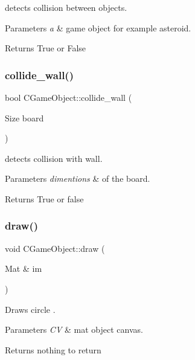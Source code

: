 detects collision between objects. 


\begin{DoxyParams}{Parameters}
{\em a} & game object for example asteroid. \\
\hline
\end{DoxyParams}
\begin{DoxyReturn}{Returns}
True or False 
\end{DoxyReturn}
\hypertarget{class_c_game_object_af1e3da2a3e10a0c11c090056eb0d027e}{}\label{class_c_game_object_af1e3da2a3e10a0c11c090056eb0d027e} 
\subsubsection{\texorpdfstring{collide\+\_\+wall()}{collide\_wall()}}
{\footnotesize\ttfamily bool C\+Game\+Object\+::collide\+\_\+wall (\begin{DoxyParamCaption}\item[{Size}]{board }\end{DoxyParamCaption})}



detects collision with wall. 


\begin{DoxyParams}{Parameters}
{\em dimentions} & of the board. \\
\hline
\end{DoxyParams}
\begin{DoxyReturn}{Returns}
True or false 
\end{DoxyReturn}
\hypertarget{class_c_game_object_a4cb82332eb6e3e8878eb911f6d431ebe}{}\label{class_c_game_object_a4cb82332eb6e3e8878eb911f6d431ebe} 
\subsubsection{\texorpdfstring{draw()}{draw()}}
{\footnotesize\ttfamily void C\+Game\+Object\+::draw (\begin{DoxyParamCaption}\item[{Mat \&}]{im }\end{DoxyParamCaption})}



Draws circle . 


\begin{DoxyParams}{Parameters}
{\em CV} & mat object canvas. \\
\hline
\end{DoxyParams}
\begin{DoxyReturn}{Returns}
nothing to return 
\end{DoxyReturn}
\hypertarget{class_c_game_object_a9c794264bb1c37231f137b0df3a8ccbc}{}\label{class_c_game_object_a9c794264bb1c37231f137b0df3a8ccbc} 
